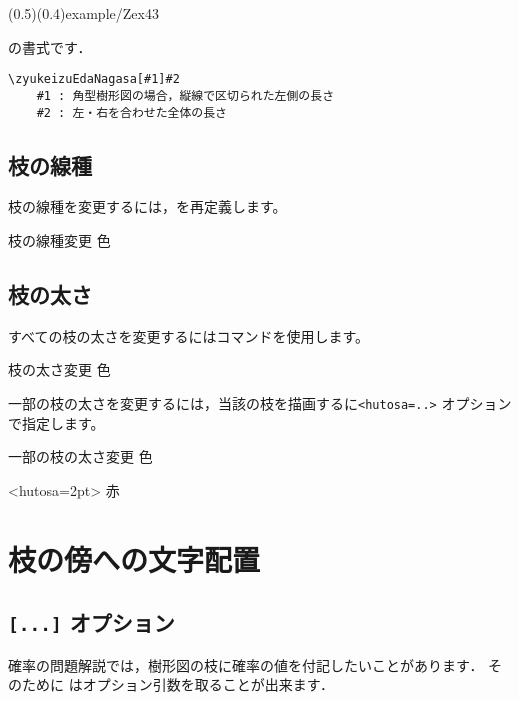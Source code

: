 \documentclass[a4j]{jarticle}
\begin{document}
{\showexample[角型における長さ指定](0.5)(0.4){example/Zex43}}

の書式です．
\begin{boxnote}
\begin{verbatim}
\zyukeizuEdaNagasa[#1]#2
    #1 : 角型樹形図の場合，縦線で区切られた左側の長さ
    #2 : 左・右を合わせた全体の長さ
\end{verbatim}
\end{boxnote}

\subsection{枝の線種}
枝の線種を変更するには，を再定義します。

\begin{showEx}{枝の線種変更}
\def\sensyu{\hasen}
色 %
\begin{zyukeizu}%
\end{zyukeizu}%
\end{showEx}

\subsection{枝の太さ}
すべての枝の太さを変更するにはコマンドを使用します。

\begin{showEx}{枝の太さ変更}
\edahutosa{2pt}
色 %
\begin{zyukeizu}%
\end{zyukeizu}%
\end{showEx}

一部の枝の太さを変更するには，当該の枝を描画するに\verb+<hutosa=..>+
オプションで指定します。

\begin{showEx}{一部の枝の太さ変更}
色 %
\begin{zyukeizu}%
    \eda<hutosa=2pt>{ 赤 }%
\end{zyukeizu}%
\end{showEx}



\section{枝の傍への文字配置}
\subsection{\texttt{[...]} オプション}
確率の問題解説では，樹形図の枝に確率の値を付記したいことがあります．
そのために  はオプション引数を取ることが出来ます．
\end{document}
